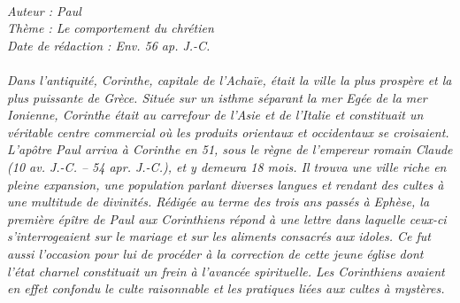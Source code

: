 \BFont
\noindent\hrulefill
{\footnotesize
\textit{
\bigskip
{\centering{}
\\Auteur : Paul
\\Thème : Le comportement du chrétien
\\Date de rédaction : Env. 56 ap. J.-C.\\}
}
\textit{
\\Dans l’antiquité, Corinthe, capitale de l’Achaïe, était la ville la plus prospère et la plus puissante de Grèce. Située sur
un isthme séparant la mer Egée de la mer Ionienne, Corinthe était au carrefour de l’Asie et de l’Italie et constituait un  véritable centre commercial où les produits orientaux et occidentaux se croisaient.
\\L’apôtre Paul arriva à Corinthe en 51, sous le règne de l’empereur romain Claude (10 av. J.-C. – 54 apr. J.-C.), et y demeura 18 mois. Il trouva une ville riche en pleine expansion, une population parlant diverses langues et rendant des cultes à une multitude de divinités. Rédigée au terme des trois ans passés à Ephèse, la première épître de Paul aux Corinthiens répond à une lettre dans laquelle ceux-ci s’interrogeaient sur le mariage et sur les aliments consacrés aux idoles. Ce fut aussi l’occasion pour lui de procéder à la correction de cette jeune église dont l’état charnel constituait un frein à l’avancée spirituelle. Les Corinthiens avaient en effet confondu le culte raisonnable et les pratiques liées aux cultes à mystères.\bigskip
}
}
\par\nobreak\noindent\hrulefill
